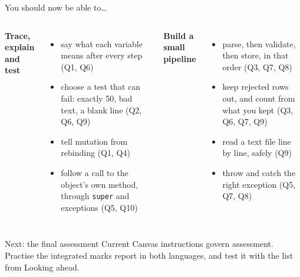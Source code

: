 \documentclass[aspectratio=169]{beamer}
\newcommand{\code}[1]{\texttt{#1}}
\newcommand{\neutrallabel}[1]{\textcolor{bkblue}{\textbf{#1}}}
\newcommand{\yes}{\textcolor{goodgreen}{\ding{51}}}
\begin{document}
\begin{frame}{You should now be able to\ldots}
  \begin{columns}[T,onlytextwidth]
    \neutrallabel{Trace, explain and test}
    \begin{itemize}[itemsep=0.12em]
      \small
      \item[\yes] say what each variable means after every step (Q1, Q6)
      \item[\yes] choose a test that can fail: exactly 50, bad text, a blank line
            (Q2, Q6, Q9)
      \item[\yes] tell mutation from rebinding (Q1, Q4)
      \item[\yes] follow a call to the object's own method, through \code{super} and
            exceptions (Q5, Q10)
    \end{itemize}
    \neutrallabel{Build a small pipeline}
    \begin{itemize}[itemsep=0.12em]
      \small
      \item[\yes] parse, then validate, then store, in that order (Q3, Q7, Q8)
      \item[\yes] keep rejected rows out, and count from what you kept
            (Q3, Q6, Q7, Q9)
      \item[\yes] read a text file line by line, safely (Q9)
      \item[\yes] throw and catch the right exception (Q5, Q7, Q8)
    \end{itemize}
  \end{columns}
  \vspace{0.3em}
  \begin{contextbox}{Next: the final assessment}
    \footnotesize Current Canvas instructions govern assessment. Practise the
    integrated marks report in both languages, and test it with the list from
    Looking ahead.
  \end{contextbox}
\end{frame}
\end{document}
